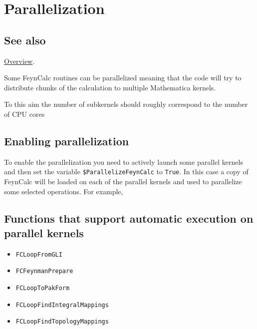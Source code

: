 \documentclass[../FeynCalcManual.tex]{subfiles}
\begin{document}
\hypertarget{parallelization}{
\section{Parallelization}\label{parallelization}}

\subsection{See also}

\hyperlink{toc}{Overview}.

Some FeynCalc routines can be parallelized meaning that the code will
try to distribute chunks of the calculation to multiple Mathematica
kernels.

To this aim the number of subkernels should roughly correspond to the
number of CPU cores

\subsection{Enabling parallelization}\label{enabling-parallelization}

To enable the parallelization you need to actively launch some parallel
kernels and then set the variable \texttt{\$ParallelizeFeynCalc} to
\texttt{True}. In this case a copy of FeynCalc will be loaded on each of
the parallel kernels and used to parallelize some selected operations.
For example,

\begin{Shaded}
\begin{Highlighting}[]
\OperatorTok{[}\OperatorTok{]}
\ExtensionTok{=} 
\end{Highlighting}
\end{Shaded}

\subsection{Functions that support automatic execution on parallel
kernels}\label{functions-that-support-automatic-execution-on-parallel-kernels}

\begin{itemize}
\tightlist
\item
  \texttt{FCLoopFromGLI}
\item
  \texttt{FCFeynmanPrepare}
\item
  \texttt{FCLoopToPakForm}
\item
  \texttt{FCLoopFindIntegralMappings}
\item
  \texttt{FCLoopFindTopologyMappings}
\end{itemize}
\end{document}
